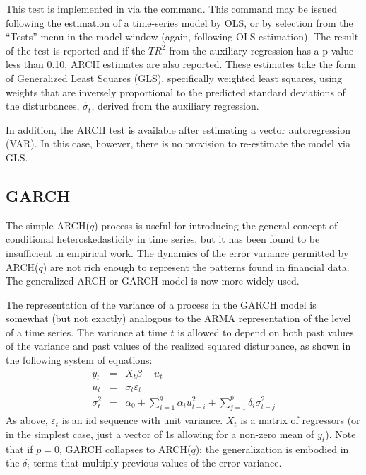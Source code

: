 This test is implemented in  via the  command.
This command may be issued following the estimation of a time-series
model by OLS, or by selection from the ``Tests'' menu in the model
window (again, following OLS estimation).  The result of the test is
reported and if the $TR^2$ from the auxiliary regression has a p-value
less than 0.10, ARCH estimates are also reported.  These estimates
take the form of Generalized Least Squares (GLS), specifically
weighted least squares, using weights that are inversely proportional
to the predicted standard deviations of the disturbances,
$\hat{\sigma}_t$, derived from the auxiliary regression.

In addition, the ARCH test is available after estimating a vector
autoregression (VAR).  In this case, however, there is no provision to
re-estimate the model via GLS.

\subsection{GARCH}
\label{subsec:garch}

The simple ARCH($q$) process is useful for introducing the general
concept of conditional heteroskedasticity in time series, but it has
been found to be insufficient in empirical work.  The dynamics of the
error variance permitted by ARCH($q$) are not rich enough to represent 
the patterns found in financial data.  The generalized ARCH or GARCH
model is now more widely used.  

The representation of the variance of a process in the GARCH model is
somewhat (but not exactly) analogous to the ARMA representation of the
level of a time series.  The variance at time $t$ is allowed
to depend on both past values of the variance and past values of the
realized squared disturbance, as shown in the following system
of equations:
\begin{eqnarray}
  \label{eq:garch-meaneq}
  y_t &  = & X_t \beta + u_t \\
  \label{eq:garch-epseq}
  u_t &  = & \sigma_t \varepsilon_t \\
  \label{eq:garch-vareq}
  \sigma^2_t & = & \alpha_0 + \sum_{i=1}^q \alpha_i u^2_{t-i} +
	  \sum_{j=1}^p \delta_i \sigma^2_{t-j}
\end{eqnarray}
As above, $\varepsilon_t$ is an iid sequence with unit variance.
$X_t$ is a matrix of regressors (or in the simplest case,
just a vector of 1s allowing for a non-zero mean of $y_t$).  Note that
if $p=0$, GARCH collapses to ARCH($q$): the generalization is embodied
in the $\delta_i$ terms that multiply previous values of the error
variance.

